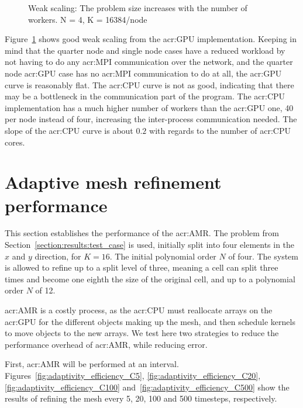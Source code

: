 \begin{figure}[H]
	\centering
	
	\caption{Weak scaling: The problem size increases with the number of workers. N = 4, K = 16384/node}
	\label{fig:weak_scaling}
\end{figure}

Figure~\ref{fig:weak_scaling} shows good weak scaling from the \acrshort{acr:GPU} implementation.
Keeping in mind that the quarter node and single node cases have a reduced workload by not having to
do any \acrshort{acr:MPI} communication over the network, and the quarter node \acrshort{acr:GPU}
case has no \acrshort{acr:MPI} communication to do at all, the \acrshort{acr:GPU} curve is
reasonably flat. The \acrshort{acr:CPU} curve is not as good, indicating that there may be a
bottleneck in the communication part of the program. The \acrshort{acr:CPU} implementation has a
much higher number of workers than the \acrshort{acr:GPU} one, 40 per node instead of four,
increasing the inter-process communication needed. The slope of the \acrshort{acr:CPU} curve is
about $0.2$ with regards to the number of \acrshort{acr:CPU} cores. 

\section{Adaptive mesh refinement performance} \label{section:results:adaptivity_performance}

This section establishes the performance of the \acrlong{acr:AMR}. The problem from
Section~\ref{section:results:test_case} is used, initially split into four elements in the $x$ and
$y$ direction, for $K = 16$. The initial polynomial order $N$ of four. The system is allowed to
refine up to a split level of three, meaning a cell can split three times and become one eighth the
size of the original cell, and up to a polynomial order $N$ of 12.

\Acrlong{acr:AMR} is a costly process, as the \acrshort{acr:CPU} must reallocate arrays on the
\acrshort{acr:GPU} for the different objects making up the mesh, and then schedule kernels to move
objects to the new arrays. We test here two strategies to reduce the performance overhead of
\acrlong{acr:AMR}, while reducing error. 

First, \acrlong{acr:AMR} will be performed at an interval.
Figures~\ref{fig:adaptivity_efficiency_C5}, \ref{fig:adaptivity_efficiency_C20},
\ref{fig:adaptivity_efficiency_C100} and~\ref{fig:adaptivity_efficiency_C500} show the results of
refining the mesh every 5, 20, 100 and 500 timesteps, respectively.

